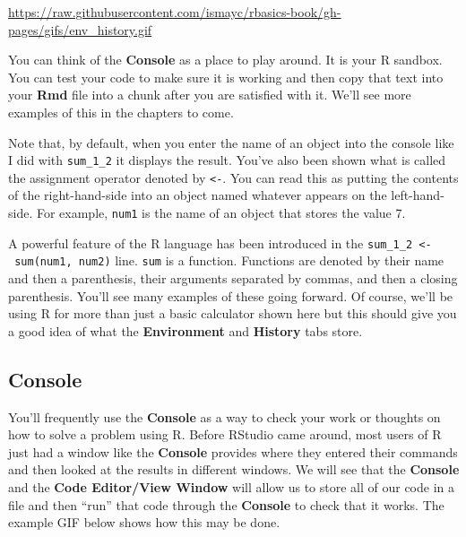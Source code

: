 \documentclass[]{tufte-book}
\begin{document}
\vspace{0.1in}

\begin{center}\footnotesize{\url{https://raw.githubusercontent.com/ismayc/rbasics-book/gh-pages/gifs/env_history.gif}}\end{center}

\vspace{0.1in}

You can think of the \textbf{Console} as a place to play around. It is
your R sandbox. You can test your code to make sure it is working and
then copy that text into your \textbf{Rmd} file into a chunk after you
are satisfied with it. We'll see more examples of this in the chapters
to come.

Note that, by default, when you enter the name of an object into the
console like I did with \texttt{sum\_1\_2} it displays the result.
You've also been shown what is called the assignment operator denoted by
\texttt{\textless{}-}. You can read this as putting the contents of the
right-hand-side into an object named whatever appears on the
left-hand-side. For example, \texttt{num1} is the name of an object that
stores the value 7.

A powerful feature of the R language has been introduced in the
\texttt{sum\_1\_2\ \textless{}-\ sum(num1,\ num2)} line. \texttt{sum} is
a function. Functions are denoted by their name and then a parenthesis,
their arguments separated by commas, and then a closing parenthesis.
You'll see many examples of these going forward. Of course, we'll be
using R for more than just a basic calculator shown here but this should
give you a good idea of what the \textbf{Environment} and
\textbf{History} tabs store.

\subsection{Console}\label{console}

You'll frequently use the \textbf{Console} as a way to check your work
or thoughts on how to solve a problem using R. Before RStudio came
around, most users of R just had a window like the \textbf{Console}
provides where they entered their commands and then looked at the
results in different windows. We will see that the \textbf{Console} and
the \textbf{Code Editor/View Window} will allow us to store all of our
code in a file and then ``run'' that code through the \textbf{Console}
to check that it works. The example GIF below shows how this may be
done.
\end{document}
